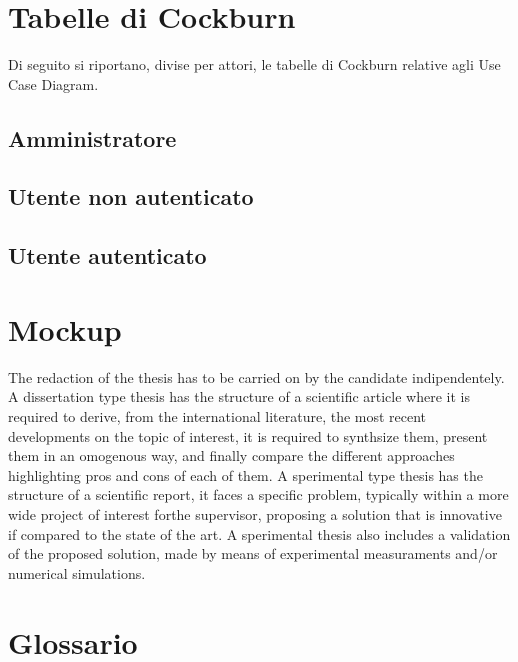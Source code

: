 \section{Tabelle di Cockburn}
Di seguito si riportano, divise per attori, le tabelle di Cockburn relative agli Use Case Diagram.
\subsection{Amministratore}


\pagebreak
\subsection{Utente non autenticato}



\pagebreak
\subsection{Utente autenticato}
\pagebreak
\section{Mockup}

The redaction of the thesis has to be carried on by the candidate indipendentely. A dissertation type thesis has the structure of a scientific article where it is required to derive, from the international literature, the most recent developments on the topic of interest, it is required to synthsize them, present them in an omogenous way, and finally compare the different approaches highlighting pros and cons of each of them. A sperimental type thesis has the structure of a scientific report, it faces a specific problem, typically within a more wide project of interest forthe supervisor, proposing a solution that is innovative if compared to the state of the art. A sperimental thesis also includes a validation of the proposed solution, made by means of experimental measuraments and/or numerical simulations.

\section{Glossario}

